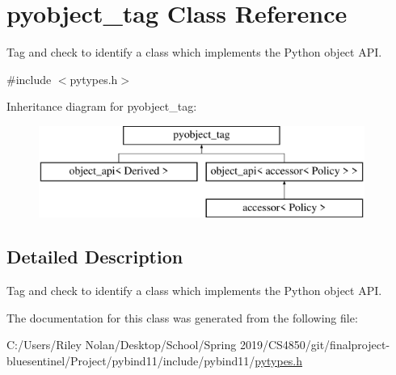 \hypertarget{classpyobject__tag}{}\section{pyobject\+\_\+tag Class Reference}
\label{classpyobject__tag}


Tag and check to identify a class which implements the Python object A\+PI.  




{\ttfamily \#include $<$pytypes.\+h$>$}

Inheritance diagram for pyobject\+\_\+tag\+:\begin{figure}[H]
\begin{center}
\leavevmode
\includegraphics[height=3.000000cm]{classpyobject__tag}
\end{center}
\end{figure}


\subsection{Detailed Description}
Tag and check to identify a class which implements the Python object A\+PI. 

The documentation for this class was generated from the following file\+:\begin{DoxyCompactItemize}
\item 
C\+:/\+Users/\+Riley Nolan/\+Desktop/\+School/\+Spring 2019/\+C\+S4850/git/finalproject-\/bluesentinel/\+Project/pybind11/include/pybind11/\mbox{\hyperlink{pytypes_8h}{pytypes.\+h}}\end{DoxyCompactItemize}
